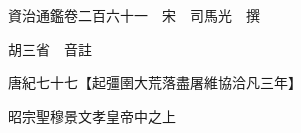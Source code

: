 










 


 
 


 

  
  
  
  
  





  
  
  
  
  
 
  

  

  
  
  



  

 
 

  
   




  

  
  


  　　資治通鑑卷二百六十一　宋　司馬光　撰

　　胡三省　音註

　　唐紀七十七【起彊圉大荒落盡屠維協洽凡三年】

　　昭宗聖穆景文孝皇帝中之上

